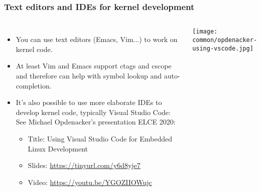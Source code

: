\begin{frame}
  \frametitle{Text editors and IDEs for kernel development}
  \begin{columns}
    \begin{itemize}
    \item You can use text editors (Emacs, Vim...) to work on kernel code.
    \item At least Vim and Emacs support ctags and cscope and therefore
          can help with symbol lookup and auto-completion.
    \item It's also possible to use more elaborate IDEs to develop
          kernel code, typically Visual Studio Code:
          See Michael Opdenacker's presentation ELCE 2020:
          \begin{itemize}
          \item Title: Using Visual Studio Code for Embedded Linux Development
          \item Slides: \url{https://tinyurl.com/y6d8yje7}
          \item Video: \url{https://youtu.be/YGOZIIOWujc}
          \end{itemize}
    \end{itemize}
    \texttt{[image: common/opdenacker-using-vscode.jpg]}
  \end{columns}
\end{frame}
